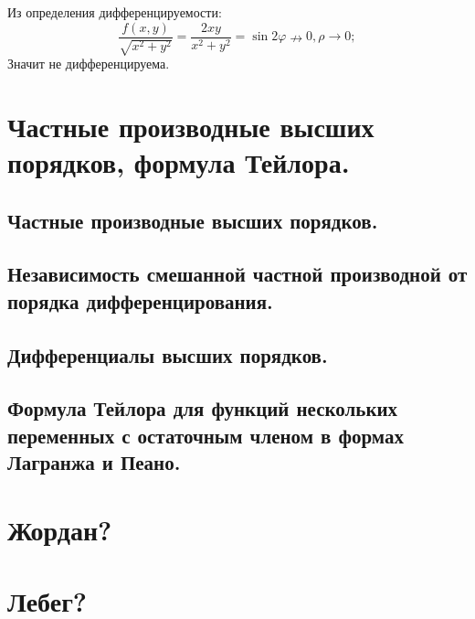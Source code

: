 \documentclass{article}
\begin{document}
Из определения дифференцируемости:
$$\frac{f(x,y)}{\sqrt{x^2+y^2}} = \frac{2xy}{x^2 + y^2} = \sin{2\varphi} \nrightarrow 0, \rho \rightarrow 0; $$
Значит не дифференцируема.

\newpage
\section{Частные производные высших порядков, формула Тейлора.}
\subsection{Частные производные высших порядков.}

\newpage
\subsection{Независимость смешанной частной производной от порядка дифференцирования.}

\newpage
\subsection{Дифференциалы высших порядков.}

\newpage
\subsection{Формула Тейлора для функций нескольких переменных с остаточным членом в формах Лагранжа и Пеано.}

\newpage
\section{Жордан?}

\newpage
\section{Лебег?}

\newpage
\end{document}
